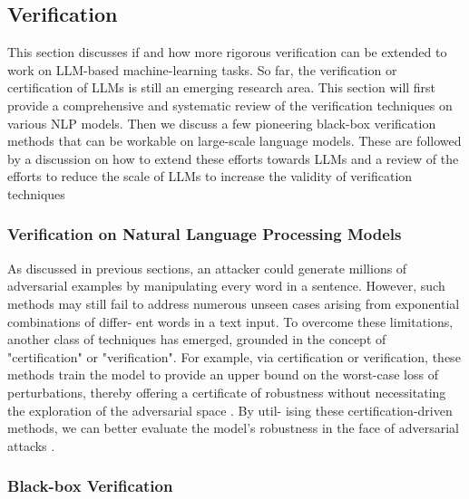 \documentclass[conference]{IEEEtran}
\begin{document}
\subsection{Verification}

This section discusses if and how more rigorous verification can be extended to work
on LLM-based machine-learning tasks. So far, the verification or certification of LLMs
is still an emerging research area. This section will first provide a comprehensive
and systematic review of the verification techniques on various NLP models. Then
we discuss a few pioneering black-box verification methods that can be workable on
large-scale language models. These are followed by a discussion on how to extend
these efforts towards LLMs and a review of the efforts to reduce the scale of LLMs to
increase the validity of verification techniques

\subsubsection*{Verification on Natural Language Processing Models}

\par As discussed in previous sections, an attacker could generate millions of adversarial
examples by manipulating every word in a sentence. However, such methods may still
fail to address numerous unseen cases arising from exponential combinations of differ-
ent words in a text input. To overcome these limitations, another class of techniques
has emerged, grounded in the concept of "certification" or "verification"\cite{seshia2016towards,huang2017safety}.
For example, via certification or verification, these methods train the model to provide
an upper bound on the worst-case loss of perturbations, thereby offering a certificate of
robustness without necessitating the exploration of the adversarial space \cite{sinha2017certifying}. By util-
ising these certification-driven methods, we can better evaluate the model’s robustness
in the face of adversarial attacks \cite{goodfellow2017challenge}.

\subsubsection*{Black-box Verification}
\end{document}

